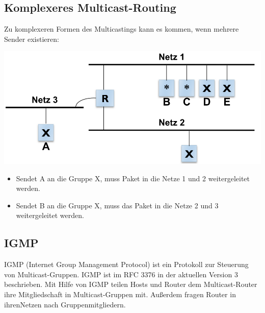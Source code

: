 \documentclass{article} %
\begin{document}
\subsection{Komplexeres Multicast-Routing}
Zu komplexeren Formen des Multicastings kann es kommen, wenn mehrere Sender existieren:
	\begin{center}
		\includegraphics[width=17cm]{img/komplMultiCast.png}
	\end{center}
	\begin{itemize}
	\item Sendet A an die Gruppe X, muss Paket in die Netze 1 und 2 weitergeleitet werden. 
	\item Sendet B an die Gruppe X, muss das Paket in die Netze 2 und 3 weitergeleitet werden. 
	\end{itemize}

\subsection{IGMP}
IGMP (Internet Group Management Protocol) ist ein Protokoll zur Steuerung von Multicast-Gruppen. IGMP ist im RFC 3376 in der aktuellen Version 3 beschrieben. Mit Hilfe von IGMP teilen Hosts und Router dem Multicast-Router ihre Mitgliedschaft in Multicast-Gruppen mit. Außerdem fragen Router in \glqq ihren\grqq Netzen nach Gruppenmitgliedern.
\end{document}
